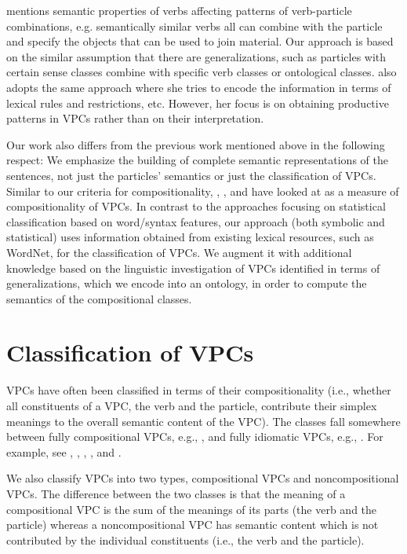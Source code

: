 \documentclass[output=paper
,modfonts
,nonflat]{langsci/langscibook}
\begin{document}
\citet{Fra76} mentions semantic properties of verbs affecting patterns of verb-particle combinations, e.g. semantically similar verbs  all can combine with the particle  and specify the objects that can be used to join material. Our approach is based on the similar assumption that there are generalizations, such as particles with certain sense classes combine with specific verb classes or ontological classes. \citet{Vil03} also adopts the same approach where she tries to encode the information in terms of lexical rules and restrictions, etc. However, her focus is on obtaining productive patterns in VPCs rather than on their interpretation.

Our work also differs from the previous work mentioned above in the following respect: We emphasize the building of complete semantic representations of the sentences, not just the particles' semantics or just the classification of VPCs. Similar to our criteria for compositionality, \citet{McC03}, \citet{Bal03}, and \citet{Ban03} have looked at  as a measure of compositionality of VPCs. In contrast to the approaches focusing on statistical classification based on word/syntax features, our approach (both symbolic and statistical) uses information obtained from existing lexical resources, such as WordNet, for the classification of VPCs. We augment it with additional knowledge based on the linguistic investigation of VPCs identified in terms of generalizations, which we encode into an ontology, in order to compute the semantics of the compositional classes.


\section{Classification of VPCs} \label{sec:classification}

VPCs have often been classified in terms of their compositionality (i.e., whether all constituents of a VPC, the verb and the particle, contribute their simplex meanings to the overall semantic content of the VPC). The classes fall somewhere between fully compositional VPCs, e.g., , and fully idiomatic VPCs, e.g., . For example, see \citet{Fra76}, \citet{Che86}, \citet{Odo98}, \citet{Deh02}, and \citet{Jac02}.

We also classify VPCs into two types, compositional VPCs and noncompositional VPCs. The difference between the two classes is that the meaning of a compositional VPC is the sum of the meanings of its parts (the verb and the particle) whereas a noncompositional VPC %
has semantic content which is not contributed by the individual constituents (i.e., the verb and the particle). 
\end{document}
